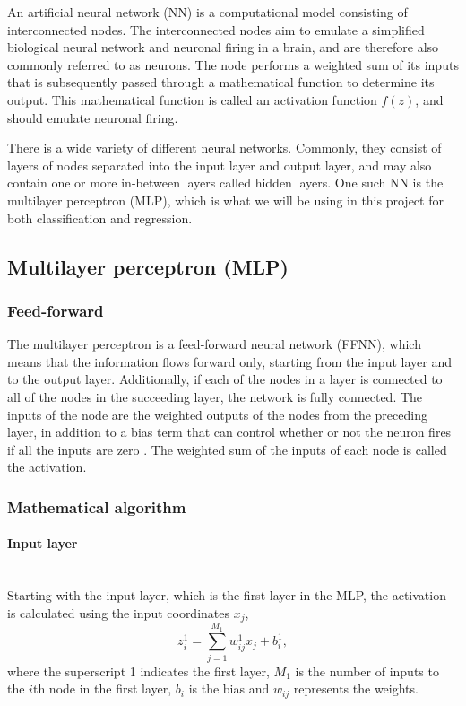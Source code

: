\documentclass[a4paper, 11pt, twocolumn]{article}
\newcommand{\myparagraph}[1]{\paragraph{#1}\mbox{}\\}
\begin{document}
An artificial neural network (NN) is a computational model consisting of
interconnected nodes. The interconnected nodes aim to emulate a simplified
biological neural network and neuronal firing in a brain, and are therefore
also commonly referred to as neurons.  The node performs a weighted sum of its
inputs that is subsequently passed through a mathematical function to determine
its output. This mathematical function is called an activation function $f(z)$,
and should emulate neuronal firing.

There is a wide variety of different neural networks. Commonly, they consist of
layers of nodes separated into the input layer and output layer, and may also
contain one or more in-between layers called hidden layers. One such NN is the
multilayer perceptron (MLP), which is what we will be using in this project for
both classification and regression.
\subsection{Multilayer perceptron (MLP)}

\subsubsection{Feed-forward  }
The multilayer perceptron is a feed-forward neural network (FFNN), which means
that the information flows forward only, starting from the input layer and to
the output layer. Additionally, if each of the nodes in a layer is connected to
all of the nodes in the succeeding layer, the network is fully connected. The
inputs of the node are the weighted outputs of the nodes from the preceding
layer, in addition to a bias term that can control whether or not the neuron
fires if all the inputs are zero \cite{ML_algo}. The weighted sum of the inputs
of each node is called the activation.

\subsubsection*{Mathematical algorithm} \myparagraph{Input layer}
Starting with the input layer, which is the first layer in the MLP, the
activation is calculated using the input coordinates $x_j$,
\begin{equation}
z_i^1 = \sum^{M_1}_{j=1}w_{ij}^1x_j + b_i^1,
\end{equation}
where the superscript 1 indicates the first layer, $M_1$ is the number of inputs
to the $i$th node in the first layer, $b_i$ is the bias and $w_{ij}$ represents
the weights.
\end{document}
